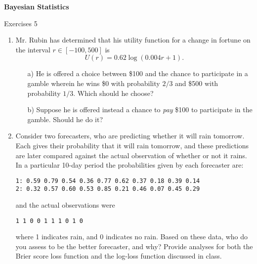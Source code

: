 \def\P{\mbox{P}}
\def\G{\Gamma}
\def\t{\theta}
\def\a{\alpha}
\def\to{\tau_0}
\def\ti{\tau_1}
\def\E{\mbox{E}}
\parindent=0in
\pagestyle{empty}



\begin{center}
{\bf
Bayesian Statistics

\smallskip

Exercises 5}

\smallskip


\end{center}


\bigskip

\begin{enumerate}


\item Mr. Rubin has determined that his utility function for a change in fortune on the interval $r \in [-100,500]$ is $$U(r) = 0.62 \log (0.004r + 1).$$
\begin{enumerate}
\item[a)] He is offered a choice between \$100 and the chance to participate in a gamble wherein he wins \$0 with probability $2/3$ and \$500 with probability $1/3$. Which should he choose?
\item[b)] Suppose he is offered instead a chance to {\it pay} \$100 to participate in the gamble. Should he do it?
\end{enumerate}



\item Consider two forecasters, who are predicting whether it will rain tomorrow. Each gives their probability that it will rain tomorrow, and these predictions are later compared against the actual observation of whether or not it rains. In a particular 10-day period the probabilities given by each forecaster are: 
\begin{verbatim}
1: 0.59 0.79 0.54 0.36 0.77 0.62 0.37 0.18 0.39 0.14
2: 0.32 0.57 0.60 0.53 0.85 0.21 0.46 0.07 0.45 0.29
\end{verbatim}
and the actual observations were
\begin{verbatim}
1 1 0 0 1 1 1 0 1 0
\end{verbatim}
where 1 indicates rain, and 0 indicates no rain.
Based on these data, who do you assess to be the better forecaster, and why? Provide analyses for both the Brier score loss function and the log-loss function discussed in class.


\end{enumerate}
